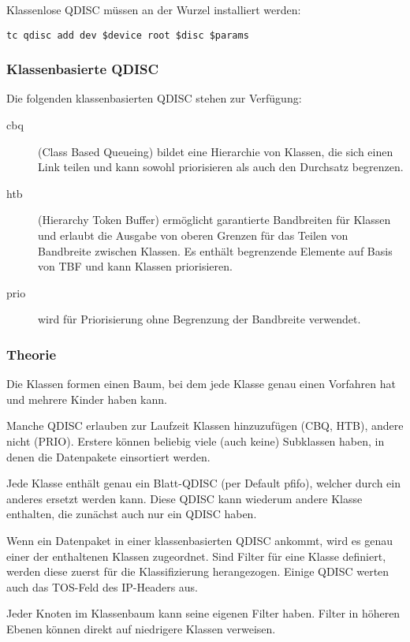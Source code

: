   Klassenlose QDISC müssen an der Wurzel installiert werden:
  \begin{verbatim}
tc qdisc add dev $device root $disc $params
  \end{verbatim}

  \subsubsection*{Klassenbasierte QDISC}
  Die folgenden klassenbasierten QDISC stehen zur Verfügung:
  \begin{description}
    \item[cbq] (Class Based Queueing) bildet eine Hierarchie von Klassen, die
      sich einen Link teilen und kann sowohl priorisieren als auch den
      Durchsatz begrenzen.
    \item[htb] (Hierarchy Token Buffer) ermöglicht garantierte Bandbreiten für
      Klassen und erlaubt die Ausgabe von oberen Grenzen für das Teilen von
      Bandbreite zwischen Klassen. Es enthält begrenzende Elemente auf Basis
      von TBF und kann Klassen priorisieren.
    \item[prio] wird für Priorisierung ohne Begrenzung der Bandbreite
      verwendet.
  \end{description}

  \subsubsection*{Theorie}
  Die Klassen formen einen Baum, bei dem jede Klasse genau einen Vorfahren hat
  und mehrere Kinder haben kann.

  Manche QDISC erlauben zur Laufzeit Klassen hinzuzufügen (CBQ, HTB), andere
  nicht (PRIO). Erstere können beliebig viele (auch keine) Subklassen haben,
  in denen die Datenpakete einsortiert werden.

  Jede Klasse enthält genau ein Blatt-QDISC (per Default pfifo), welcher durch
  ein anderes ersetzt werden kann. Diese QDISC kann wiederum andere Klasse
  enthalten, die zunächst auch nur ein QDISC haben.

  Wenn ein Datenpaket in einer klassenbasierten QDISC ankommt, wird es genau
  einer der enthaltenen Klassen zugeordnet. Sind Filter für eine Klasse
  definiert, werden diese zuerst für die Klassifizierung herangezogen. Einige
  QDISC werten auch das TOS-Feld des IP-Headers aus.

  Jeder Knoten im Klassenbaum kann seine eigenen Filter haben. Filter in
  höheren Ebenen können direkt auf niedrigere Klassen verweisen.

